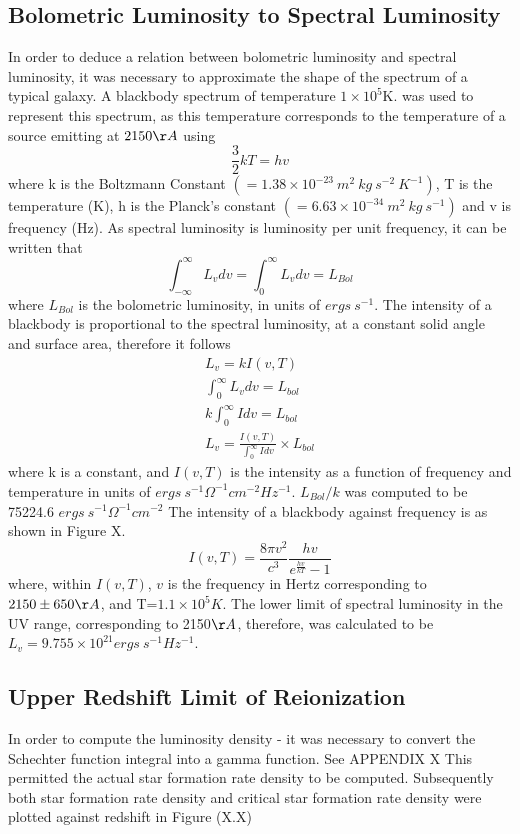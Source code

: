 \documentclass[pdf,color]{UoBnote}
\begin{document}
\subsection{Bolometric Luminosity to Spectral Luminosity}
In order to deduce a relation between bolometric luminosity and spectral luminosity, it was necessary to approximate the shape of the spectrum of a typical galaxy. A blackbody spectrum of temperature $1\times 10^5$K. was used to represent this spectrum, as this temperature corresponds to the temperature of a source emitting at $2150\AA$ using
\begin{equation}
\frac{3}{2}kT=hv
\end{equation}
\newline
where k is the Boltzmann Constant $(=1.38\times10^{-23} \ m^2 \ kg \ s^{-2} \ K^{-1})$, T is the temperature (K), h is the Planck's constant $(=6.63\times 10^{-34} \ m^{2} \ kg \ s^{-1})$ and v is frequency (Hz). As spectral luminosity is luminosity per unit frequency, it can be written that
\begin{equation}
\int^{\infty}_{-\infty}L_v dv = \int^{\infty}_{0}L_v dv = L_{Bol}
\end{equation} 
where $L_{Bol}$ is the bolometric luminosity, in units of $ergs \ s^{-1}$. The intensity of a blackbody is proportional to the spectral luminosity, at a constant solid angle and surface area, therefore it follows 
\begin{eqnarray}
L_v= kI(v,T) \\
\int^{\infty}_{0}L_v dv=L_{bol} \\
k\int^{\infty}_{0}I dv=L_{bol} \\
L_v = \frac{I(v,T)}{\int^{\infty}_{0}I dv} \times L_{bol}
\end{eqnarray}
where k is a constant, and $I(v,T)$ is the intensity as a function of frequency and temperature in units of $ergs \ s^{-1} \Omega^{-1} cm^{-2} Hz^{-1}$. $L_{Bol}/k$ was computed to be 75224.6 $ergs \ s^{-1} \Omega^{-1} cm^{-2}$ The intensity of a blackbody against frequency is as shown in Figure X.
\begin{equation}
I(v,T)=\frac{8\pi v^2}{c^3}\frac{hv}{e^\frac{hv}{kT}-1}
\end{equation}
where, within $I(v,T)$, $v$ is the frequency in Hertz corresponding to $2150\pm 650 \AA$, and T=$1.1\times 10^5K$. The lower limit of spectral luminosity in the UV range, corresponding to 2150$\AA$, therefore, was calculated to be $L_v =9.755\times 10^{21} ergs \ s^{-1} Hz^{-1}$.
\clearpage
\subsection{Upper Redshift Limit of Reionization}
In order to compute the luminosity density - it was necessary to convert the Schechter function integral into a gamma function. See APPENDIX X
This permitted the actual star formation rate density to be computed. Subsequently both star formation rate density and critical star formation rate density were plotted against redshift in Figure (X.X)
\end{document}
